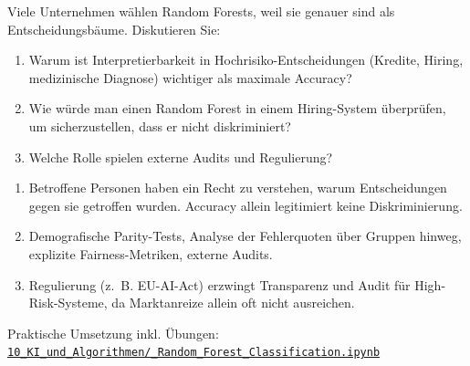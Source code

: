 \begin{mychallenge}
    Viele Unternehmen wählen Random Forests, weil sie genauer sind als Entscheidungsbäume. Diskutieren Sie:
    \begin{enumerate}
        \item Warum ist Interpretierbarkeit in Hochrisiko-Entscheidungen (Kredite, Hiring, medizinische Diagnose) wichtiger als maximale Accuracy?
        \item Wie würde man einen Random Forest in einem Hiring-System überprüfen, um sicherzustellen, dass er nicht diskriminiert?
        \item Welche Rolle spielen externe Audits und Regulierung?
    \end{enumerate}
    \begin{myanswer}
        \begin{enumerate}
            \item Betroffene Personen haben ein Recht zu verstehen, warum Entscheidungen gegen sie getroffen wurden. Accuracy allein legitimiert keine Diskriminierung.
            \item Demografische Parity-Tests, Analyse der Fehlerquoten über Gruppen hinweg, explizite Fairness-Metriken, externe Audits.
            \item Regulierung (z.~B. EU-AI-Act) erzwingt Transparenz und Audit für High-Risk-Systeme, da Marktanreize allein oft nicht ausreichen.
        \end{enumerate}
    \end{myanswer}
\end{mychallenge}

\begin{myremark}[Notebook]
    Praktische Umsetzung inkl. Übungen:\newline
    \href{\notebookurl}{\texttt{10\_KI\_und\_Algorithmen/\_Random\_Forest\_Classification.ipynb}}
\end{myremark}
